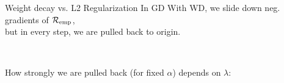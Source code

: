 \documentclass[11pt,compress,t,notes=noshow, xcolor=table]{beamer}
\begin{document}
\begin{vbframe}{Weight decay vs. L2 Regularization}
In GD With WD, we slide down neg. gradients of $\mathcal{R}_{\text{emp}}$, \\
but in every step, we are pulled back to origin.
\begin{figure}
  \\
\end{figure}


\framebreak

How strongly we are pulled back (for fixed $\alpha$) depends on $\lambda$:


\end{vbframe}
\end{document}
